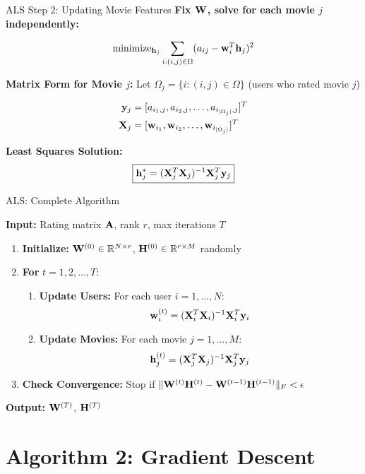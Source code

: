 \documentclass{beamer}
\begin{document}
\begin{frame}{ALS Step 2: Updating Movie Features}
\textbf{Fix $\mathbf{W}$, solve for each movie $j$ independently:}

\pause
\begin{equation*}
\operatorname{minimize}_{\mathbf{h}_j} \sum_{i: (i,j) \in \Omega} (a_{ij} - \mathbf{w}_i^T \mathbf{h}_j)^2
\end{equation*}

\pause
\textbf{Matrix Form for Movie $j$:}
Let $\Omega_j = \{i: (i,j) \in \Omega\}$ (users who rated movie $j$)

\pause
\begin{align}
\mathbf{y}_j &= [a_{i_1,j}, a_{i_2,j}, \ldots, a_{i_{|\Omega_j|},j}]^T \\
\mathbf{X}_j &= [\mathbf{w}_{i_1}, \mathbf{w}_{i_2}, \ldots, \mathbf{w}_{i_{|\Omega_j|}}]^T
\end{align}

\pause
\textbf{Least Squares Solution:}
\begin{equation*}
\boxed{\mathbf{h}_j^* = (\mathbf{X}_j^T \mathbf{X}_j)^{-1} \mathbf{X}_j^T \mathbf{y}_j}
\end{equation*}
\end{frame}

\begin{frame}{ALS: Complete Algorithm}
\begin{algorithm}[H]
\textbf{Input:} Rating matrix $\mathbf{A}$, rank $r$, max iterations $T$
\begin{enumerate}[<+->]
    \item \textbf{Initialize:} $\mathbf{W}^{(0)} \in \mathbb{R}^{N \times r}$, $\mathbf{H}^{(0)} \in \mathbb{R}^{r \times M}$ randomly
    \item \textbf{For} $t = 1, 2, \ldots, T$:
    \begin{enumerate}
        \item \textbf{Update Users:} For each user $i = 1, \ldots, N$:
        $$\mathbf{w}_i^{(t)} = (\mathbf{X}_i^T \mathbf{X}_i)^{-1} \mathbf{X}_i^T \mathbf{y}_i$$
        \item \textbf{Update Movies:} For each movie $j = 1, \ldots, M$:
        $$\mathbf{h}_j^{(t)} = (\mathbf{X}_j^T \mathbf{X}_j)^{-1} \mathbf{X}_j^T \mathbf{y}_j$$
    \end{enumerate}
    \item \textbf{Check Convergence:} Stop if $\|\mathbf{W}^{(t)}\mathbf{H}^{(t)} - \mathbf{W}^{(t-1)}\mathbf{H}^{(t-1)}\|_F < \epsilon$
\end{enumerate}
\textbf{Output:} $\mathbf{W}^{(T)}$, $\mathbf{H}^{(T)}$
\end{algorithm}
\end{frame}

\section{Algorithm 2: Gradient Descent}
\end{document}
